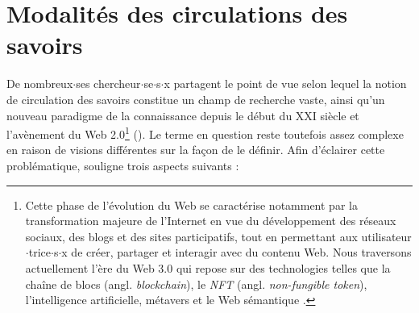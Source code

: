 \label{sota}
\section{Modalités des circulations des savoirs}
De nombreux$\cdot$ses chercheur$\cdot$se$\cdot$s$\cdot$x partagent le point de vue selon lequel la notion de \og{}circulation des savoirs\fg{} constitue un champ de recherche vaste, ainsi qu'un nouveau paradigme de la connaissance depuis le début du XXI\ieme{} siècle et l'avènement du Web 2.0\footnote{Cette phase de l'évolution du Web se caractérise notamment par la transformation majeure de l'Internet en vue du développement des réseaux sociaux, des blogs et des sites participatifs, tout en permettant aux utilisateur$\cdot$trice$\cdot$s$\cdot$x de créer, partager et interagir avec du contenu Web. Nous traversons actuellement l'ère du Web 3.0 qui repose sur des technologies telles que la chaîne de blocs (angl. \textit{blockchain}), le \textit{NFT} (angl. \textit{non-fungible token}), l'intelligence artificielle, métavers et le Web sémantique \citep{varet2023nouvelles}.}
(\citealp{landais2014frederic,quet2014frederic}). Le terme en question reste toutefois assez complexe en raison de visions différentes sur la façon de le définir. Afin d'éclairer cette problématique, \citet{quet2014frederic} souligne trois aspects suivants :
